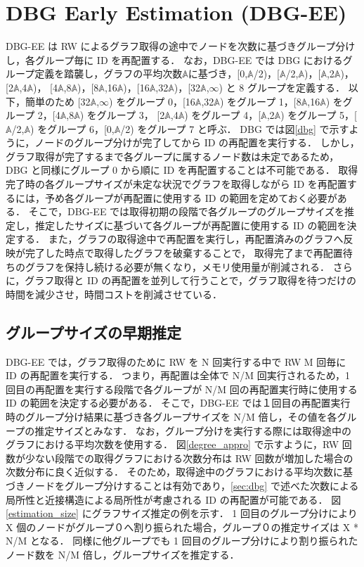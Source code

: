 \section{DBG Early Estimation (DBG-EE)}
DBG-EE は RW によるグラフ取得の途中でノードを次数に基づきグループ分けし，各グループ毎に ID を再配置する．
なお，DBG-EE では DBG におけるグループ定義を踏襲し，グラフの平均次数$\mathbb{A}$に基づき，[0,$\mathbb{A}$/2)，[$\mathbb{A}$/2,$\mathbb{A}$)，[$\mathbb{A}$,2$\mathbb{A}$)，[2$\mathbb{A}$,4$\mathbb{A}$)，
[4$\mathbb{A}$,8$\mathbb{A}$)，[8$\mathbb{A}$,16$\mathbb{A}$)，[16$\mathbb{A}$,32$\mathbb{A}$)，[32$\mathbb{A}$,$\infty$)
と 8 グループを定義する．
以下，簡単のため [32$\mathbb{A}$,$\infty$) をグループ 0，[16$\mathbb{A}$,32$\mathbb{A}$) をグループ 1，[8$\mathbb{A}$,16$\mathbb{A}$) をグループ 2，[4$\mathbb{A}$,8$\mathbb{A}$) をグループ 3，
[2$\mathbb{A}$,4$\mathbb{A}$) をグループ 4，[$\mathbb{A}$,2$\mathbb{A}$) をグループ 5，[$\mathbb{A}$/2,$\mathbb{A}$) をグループ 6，[0,$\mathbb{A}$/2) をグループ 7 と呼ぶ．
DBG では図\ref{dbg} で示すように，ノードのグループ分けが完了してから ID の再配置を実行する．
しかし，グラフ取得が完了するまで各グループに属するノード数は未定であるため，DBG と同様にグループ 0 から順に ID を再配置することは不可能である．
取得完了時の各グループサイズが未定な状況でグラフを取得しながら ID を再配置するには，予め各グループが再配置に使用する ID の範囲を定めておく必要がある．
そこで，DBG-EE では取得初期の段階で各グループのグループサイズを推定し，推定したサイズに基づいて各グループが再配置に使用する ID の範囲を決定する．
また，グラフの取得途中で再配置を実行し，再配置済みのグラフへ反映が完了した時点で取得したグラフを破棄することで，
取得完了まで再配置待ちのグラフを保持し続ける必要が無くなり，メモリ使用量が削減される．
さらに，グラフ取得と ID の再配置を並列して行うことで，グラフ取得を待つだけの時間を減少させ，時間コストを削減させている．

\subsection{グループサイズの早期推定}
DBG-EE では，グラフ取得のために RW を N 回実行する中で RW M 回毎に ID の再配置を実行する．
つまり，再配置は全体で N/M 回実行されるため，1 回目の再配置を実行する段階で各グループが N/M 回の再配置実行時に使用する ID の範囲を決定する必要がある．
そこで，DBG-EE では１回目の再配置実行時のグループ分け結果に基づき各グループサイズを N/M 倍し，その値を各グループの推定サイズとみなす．
なお，グループ分けを実行する際には取得途中のグラフにおける平均次数を使用する．
図\ref{degree_appro} で示すように，RW 回数が少ない段階での取得グラフにおける次数分布は RW 回数が増加した場合の次数分布に良く近似する．
そのため，取得途中のグラフにおける平均次数に基づきノードをグループ分けすることは有効であり，\ref{sec:dbg} で述べた次数による局所性と近接構造による局所性が考慮される ID の再配置が可能である．
図\ref{estimation_size} にグラフサイズ推定の例を示す．
1 回目のグループ分けにより X 個のノードがグループ０へ割り振られた場合，グループ０の推定サイズは X * N/M となる．
同様に他グループでも 1 回目のグループ分けにより割り振られたノード数を N/M 倍し，グループサイズを推定する．

